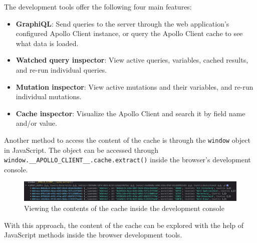 \noindent The development tools offer the following four main features: \cite{misc:-:background:graphql:apollo-developer-tools}

\begin{itemize}
    \item \textbf{GraphiQL}: Send queries to the server through the web application's configured Apollo Client instance, or query the Apollo Client cache to see what data is loaded.
    \item \textbf{Watched query inspector}: View active queries, variables, cached results, and re-run individual queries.
    \item \textbf{Mutation inspector}: View active mutations and their variables, and re-run individual mutations.
    \item \textbf{Cache inspector}: Visualize the Apollo Client and search it by field name and/or value.
\end{itemize}

\noindent Another method to access the content of the cache is through the \texttt{window} object in JavaScript. The object can be accessed through \texttt{window.\_\_APOLLO\_CLIENT\_\_.cache.extract()} inside the browser's development console.

\ifshowImages
\begin{figure}[H]
    \centering
    \includegraphics[width=1\linewidth]{images/background/apollo/apollo-cache-browser-window.jpeg}
    \caption{Viewing the contents of the cache inside the development console}\label{fig:background:graphql:apollo:apollo-cache-browser-window}
\end{figure}
\fi

\noindent  With this approach, the content of the cache can be explored with the help of JavaScript methods inside the browser development tools.




